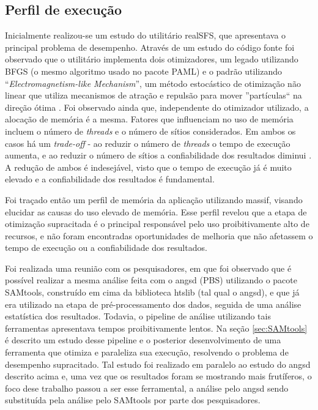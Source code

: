\documentclass[cic,tc]{iiufrgs}
\begin{document}
{\subsection{Perfil de execução}

Inicialmente realizou-se um estudo do utilitário realSFS, que apresentava o
principal problema de desempenho. Através de um estudo do código fonte foi
observado que o utilitário implementa dois otimizadores, um legado utilizando
BFGS (o mesmo algoritmo usado no pacote PAML) e o padrão utilizando
``\textit{Electromagnetism-like Mechanism}'', um método estocástico de otimização
não linear que utiliza mecanismos de atração e repulsão para mover
''partículas`` na direção ótima \cite{5636954}. Foi observado ainda que,
independente do otimizador utilizado, a alocação de memória é a mesma. Fatores
que influenciam no uso de memória incluem o número de \textit{threads} e o número de
sítios considerados. Em ambos os casos há um \textit{trade-off} - ao reduzir o
número de \textit{threads} o tempo de execução aumenta, e ao reduzir o número de sítios
a confiabilidade dos resultados diminui \cite{popgen2016angsd}. A redução de
ambos é indesejável, visto que o tempo de execução já é muito elevado e a
confiabilidade dos resultados é fundamental.

Foi traçado então um perfil de memória da aplicação utilizando massif,
visando elucidar as causas do uso elevado de memória. Esse perfil revelou que a
etapa de otimização supracitada é o principal responsável pelo uso
proibitivamente alto de recursos, e não foram encontradas oportunidades de
melhoria que não afetassem o tempo de execução ou a confiabilidade dos
resultados.

Foi realizada uma reunião com os pesquisadores, em que foi observado que é
possível realizar a mesma análise feita com o angsd (PBS) utilizando o pacote
SAMtools, construído em cima da biblioteca htslib (tal qual o angsd), e que já
era utilizado na etapa de pré-processamento dos dados, seguida de uma análise
estatística dos resultados. Todavia, o pipeline de análise utilizando tais
ferramentas apresentava tempos proibitivamente lentos. Na seção
\ref{sec:SAMtools} é descrito um estudo desse pipeline e o posterior
desenvolvimento de uma ferramenta que otimiza e paraleliza sua execução,
resolvendo o problema de desempenho supracitado. Tal estudo foi realizado em
paralelo ao estudo do angsd descrito acima e, uma vez que os resultados foram
se mostrando mais frutíferos, o foco dese trabalho passou a ser esse
ferramental, a análise pelo angsd sendo substituída pela análise pelo SAMtools
por parte dos pesquisadores.

}
\end{document}
